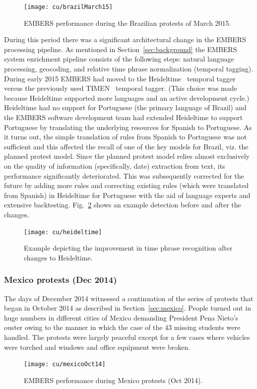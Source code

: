 \begin{figure}
\centering
\texttt{[image: cu/brazilMarch15]}
\caption{EMBERS performance during the Brazilian protests of March 2015.}
\label{fig:brazilSpring}
\end{figure}

During this period there was a significant architectural change in the
EMBERS processing pipeline. As mentioned in Section~\ref{sec:background} the
EMBERS system enrichment pipeline consists of the following steps: natural language processing,
geocoding, and relative time phrase normalization (temporal tagging). During early 2015
EMBERS had moved to the Heideltime~\cite{heideltime} temporal
tagger versus the previously used TIMEN~\cite{timen} temporal tagger. (This
choice was made because
Heideltime supported more languages and an active development cycle.)
Heideltime had no support for Portuguese (the primary
language of Brazil) and the EMBERS software development team had 
extended Heideltime to
support Portuguese by translating the underlying
resources for Spanish to Portuguese. As it turns out,
the simple translation of rules from Spanish to Portuguese
was not sufficient and this affected the recall of one of the key models
for Brazil, viz. the planned protest model.
Since the planned protest model relies
almost exclusively on the quality of information (specifically, date) extraction from text,
its performance significantly deteriorated.
This was subsequently corrected for the future by adding
more rules and correcting existing rules (which were translated from
Spanish) in Heideltime for Portuguese with the aid of language experts and
extensive backtesting. Fig.~\ref{fig:heideltime} shows an example
detection before and after the changes.

\begin{figure}
  \centering
\texttt{[image: cu/heideltime]}
\caption{Example depicting the improvement in time phrase
recognition after changes to
Heideltime.}
\label{fig:heideltime}
\end{figure}

\vspace{2em}
\subsubsection{Mexico protests (Dec 2014)}
The days of December 2014 witnessed a continuation of the series of protests that began in October 2014
as described in Section~\ref{sec:mexico}. People turned out in huge numbers in different cities of Mexico demanding
President Pena Nieto's ouster owing to the manner in which the case of the 43 missing students were handled.
The protests were largely peaceful except for a few cases where vehicles were torched and windows and office equipment
were broken.
\begin{figure} %
\centering
\texttt{[image: cu/mexicoOct14]}
\caption{EMBERS performance during Mexico protests (Oct 2014).}
\label{fig:mexicoOct14}
\end{figure}

